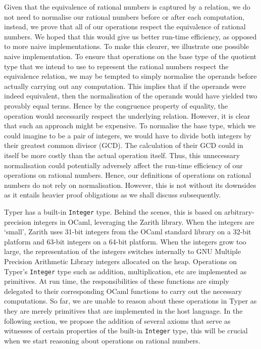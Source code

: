 \documentclass[12pt,twoside,maitrise]{dms}
\theoremstyle{definition}
\numberwithin{equation}{section}
\numberwithin{table}{chapter}
\numberwithin{figure}{chapter}
\newcommand\id[1] {\texttt{#1}}
\begin{document}
Given that the equivalence of rational numbers is captured by a relation, we do
not need to normalise our rational numbers before or after each computation,
instead, we prove that all of our operations respect the equivalence of rational
numbers. We hoped that this would give us better run-time efficiency, as opposed
to more naive implementations. To make this clearer, we illustrate one possible
naive implementation. To ensure that operations on the base type of the quotient
type that we intend to use to represent the rational numbers respect the
equivalence relation, we may be tempted to simply normalise the operands before
actually carrying out any computation. This implies that if the operands were
indeed equivalent, then the normalisation of the operands would have yielded two
provably equal terms. Hence by the congruence property of equality, the
operation would necessarily respect the underlying relation. However, it is
clear that such an approach might be expensive. To normalise the base type,
which we could imagine to be a pair of integers, we would have to divide both
integers by their greatest common divisor (GCD). The calculation of their GCD
could in itself be more costly than the actual operation itself. Thus, this
unnecessary normalisation could potentially adversely affect the run-time
efficiency of our operations on rational numbers. Hence, our definitions of
operations on rational numbers do not rely on normalisation. However, this is
not without its downsides as it entails heavier proof obligations as we shall
discuss subsequently.

Typer has a built-in \id{Integer} type. Behind the scenes, this is based on
arbitrary-precision integers in OCaml, leveraging the Zarith
library\cite{ocaml-zarith}. When the integers are `small', Zarith uses 31-bit
integers from the OCaml standard library on a 32-bit platform and 63-bit
integers on a 64-bit platform. When the integers grow too large, the
representation of the integers switches internally to GNU Multiple Precision
Arithmetic Library\cite{gnu-gmp} integers allocated on the heap. Operations on
Typer's \id{Integer} type such as addition, multiplication, etc are implemented
as primitives. At run time, the responsibilities of these functions are simply
delegated to their corresponding OCaml functions to carry out the necessary
computations. So far, we are unable to reason about these operations in Typer
as they are merely primitives that are implemented in the host language. In the
following section, we propose the addition of several axioms that serve as
witnesses of certain properties of the built-in \id{Integer} type, this will be
crucial when we start reasoning about operations on rational numbers.
\end{document}
